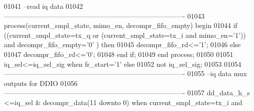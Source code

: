 \begin{DoxyCode}
01041 \textcolor{keyword}{--read iq data}
01042 \textcolor{keyword}{-------------------------------------------------------------------------------        }
01043 \textcolor{keywordflow}{process}(current_smpl_state, mimo_en, decompr_fifo_empty) \textcolor{keywordflow}{begin}
01044     \textcolor{keywordflow}{if} \textcolor{vhdlchar}{(}\textcolor{vhdlchar}{(}\textcolor{vhdlchar}{current_smpl_state}\textcolor{vhdlchar}{=}\textcolor{vhdlchar}{tx\_q} \textcolor{keywordflow}{or} \textcolor{vhdlchar}{(}\textcolor{vhdlchar}{current_smpl_state}\textcolor{vhdlchar}{=}\textcolor{vhdlchar}{tx\_i} \textcolor{keywordflow}{and} \textcolor{vhdlchar}{mimo_en}\textcolor{vhdlchar}{=}\textcolor{vhdlchar}{'}\textcolor{vhdllogic}{}\textcolor{vhdllogic}{1}\textcolor{vhdlchar}{'}\textcolor{vhdlchar}{)}\textcolor{vhdlchar}{)} \textcolor{keywordflow}{and} \textcolor{vhdlchar}{
      decompr_fifo_empty}\textcolor{vhdlchar}{=}\textcolor{vhdlchar}{'}\textcolor{vhdllogic}{}\textcolor{vhdllogic}{0}\textcolor{vhdlchar}{'} \textcolor{vhdlchar}{)} \textcolor{keywordflow}{then}
01045             \textcolor{vhdlchar}{decompr_fifo_rd}\textcolor{vhdlchar}{<=}\textcolor{vhdlchar}{'}\textcolor{vhdllogic}{}\textcolor{vhdllogic}{1}\textcolor{vhdlchar}{'}; 
01046     \textcolor{keywordflow}{else}
01047           \textcolor{vhdlchar}{decompr_fifo_rd}\textcolor{vhdlchar}{<=}\textcolor{vhdlchar}{'}\textcolor{vhdllogic}{}\textcolor{vhdllogic}{0}\textcolor{vhdlchar}{'};
01048     \textcolor{keywordflow}{end} \textcolor{keywordflow}{if}; 
01049 \textcolor{keywordflow}{end} \textcolor{keywordflow}{process};
01050 
01051 \textcolor{vhdlchar}{iq_sel}\textcolor{vhdlchar}{<=}\textcolor{vhdlchar}{iq_sel_sig} \textcolor{keywordflow}{when} \textcolor{vhdlchar}{fr_start}\textcolor{vhdlchar}{=}\textcolor{vhdlchar}{'}\textcolor{vhdllogic}{}\textcolor{vhdllogic}{1}\textcolor{vhdlchar}{'} \textcolor{keywordflow}{else} 
01052         \textcolor{keywordflow}{not} \textcolor{vhdlchar}{iq_sel_sig}; 
01053 
01054 \textcolor{keyword}{-------------------------------------------------------------------------------}
01055 \textcolor{keyword}{--iq data mux outputs for DDIO}
01056 \textcolor{keyword}{-------------------------------------------------------------------------------}
01057 \textcolor{vhdlchar}{dd_data_h_s} \textcolor{vhdlchar}{<=}\textcolor{vhdlchar}{iq_sel} \textcolor{vhdlchar}{&} \textcolor{vhdlchar}{decompr_data}\textcolor{vhdlchar}{(}\textcolor{vhdllogic}{}\textcolor{vhdllogic}{11} \textcolor{keywordflow}{downto} \textcolor{vhdllogic}{}\textcolor{vhdllogic}{0}\textcolor{vhdlchar}{)} \textcolor{keywordflow}{when} \textcolor{vhdlchar}{current_smpl_state}\textcolor{vhdlchar}{=}\textcolor{vhdlchar}{tx\_i} \textcolor{keywordflow}{and} \textcolor{vhdlchar}{
}
\end{DoxyCode}
